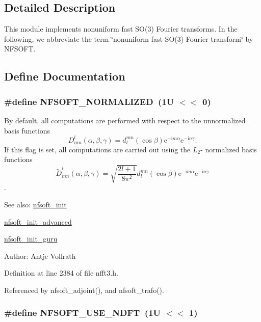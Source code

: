 \subsection{Detailed Description}
This module implements nonuniform fast SO(3) Fourier transforms. In the following, we abbreviate the term \char`\"{}nonuniform fast SO(3) Fourier transform\char`\"{} by NFSOFT. 

\subsection{Define Documentation}
\hypertarget{group__nfsoft_g8c53e32dd194bda4a828c15ad044d44a}{
\subsubsection{\setlength{\rightskip}{0pt plus 5cm}\#define NFSOFT\_\-NORMALIZED~(1U $<$$<$ 0)}}
\label{group__nfsoft_g8c53e32dd194bda4a828c15ad044d44a}


By default, all computations are performed with respect to the unnormalized basis functions \[ D_{mn}^l(\alpha,\beta,\gamma) = d^{mn}_{l}(\cos\beta) \mathrm{e}^{-\mathrm{i} m \alpha}\mathrm{e}^{-\mathrm{i} n \gamma}. \] If this flag is set, all computations are carried out using the $L_2$- normalized basis functions \[ \tilde D_{mn}^l(\alpha,\beta,\gamma) = \sqrt{\frac{2l+1}{8\pi^2}}d^{mn}_{l}(\cos\beta) \mathrm{e}^{-\mathrm{i} m \alpha}\mathrm{e}^{-\mathrm{i} n \gamma} \]. 

\begin{Desc}
\item[See also:]\hyperlink{group__nfsoft_g31c884458165fa204073c6c16c10775e}{nfsoft\_\-init} 

\hyperlink{group__nfsoft_gf4aec4ee2a2a5d56ca27c4f1a7f90b18}{nfsoft\_\-init\_\-advanced} 

\hyperlink{group__nfsoft_g1c13cdd3f82f48fa41acdd313cdc2052}{nfsoft\_\-init\_\-guru} \end{Desc}
\begin{Desc}
\item[Author:]Antje Vollrath \end{Desc}


Definition at line 2384 of file nfft3.h.

Referenced by nfsoft\_\-adjoint(), and nfsoft\_\-trafo().\hypertarget{group__nfsoft_g14cae92f8ee539b4a41aebdf913ef2c5}{
\subsubsection{\setlength{\rightskip}{0pt plus 5cm}\#define NFSOFT\_\-USE\_\-NDFT~(1U $<$$<$ 1)}}
\label{group__nfsoft_g14cae92f8ee539b4a41aebdf913ef2c5}


